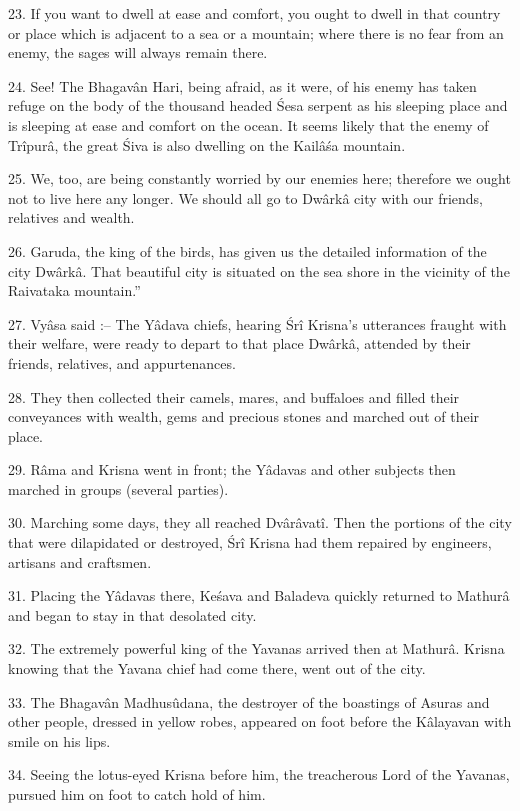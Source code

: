 23. If you want to dwell at ease and comfort, you ought to dwell in that country or place which is adjacent to a sea or a mountain; where there is no fear from an enemy, the sages will always remain there.

24. See! The Bhagav\^an Hari, being afraid, as it were, of his enemy has taken refuge on the body of the thousand headed \'Sesa serpent as his sleeping place and is sleeping at ease and comfort on the ocean. It seems likely that the enemy of Tr\^ipur\^a, the great \'Siva is also dwelling on the Kail\^a\'sa mountain.

25. We, too, are being constantly worried by our enemies here; therefore we ought not to live here any longer. We should all go to Dw\^ark\^a city with our friends, relatives and wealth.

26. Garuda, the king of the birds, has given us the detailed information of the city Dw\^ark\^a. That beautiful city is situated on the sea shore in the vicinity of the Raivataka mountain.''

27. Vy\^asa said :-- The Y\^adava chiefs, hearing \'Sr\^i Krisna's utterances fraught with their welfare, were ready to depart to that place Dw\^ark\^a, attended by their friends, relatives, and appurtenances.

28. They then collected their camels, mares, and buffaloes and filled their conveyances with wealth, gems and precious stones and marched out of their place.

29. R\^ama and Krisna went in front; the Y\^adavas and other subjects then marched in groups (several parties).

30. Marching some days, they all reached Dv\^ar\^avat\^i. Then the portions of the city that were dilapidated or destroyed, \'Sr\^i Krisna had them repaired by engineers, artisans and craftsmen.

31. Placing the Y\^adavas there, Ke\'sava and Baladeva quickly returned to Mathur\^a and began to stay in that desolated city.

32. The extremely powerful king of the Yavanas arrived then at  Mathur\^a. Krisna knowing that the Yavana chief had come there, went out of the city.

33. The Bhagav\^an Madhusûdana, the destroyer of the boastings of Asuras and other people, dressed in yellow robes, appeared on foot before the K\^alayavan with smile on his lips.

34. Seeing the lotus-eyed Krisna before him, the treacherous Lord of the Yavanas, pursued him on foot to catch hold of him.

